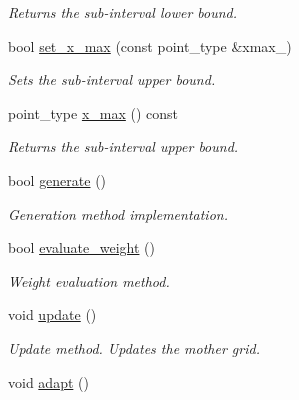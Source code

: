 \begin{DoxyCompactItemize}
\begin{DoxyCompactList}\small\item\em Returns the sub-\/interval lower bound. \end{DoxyCompactList}\item 
\hypertarget{a00391_aad23649c729902fce639ef5682b5e3a3}{bool \hyperlink{a00391_aad23649c729902fce639ef5682b5e3a3}{set\-\_\-x\-\_\-max} (const point\-\_\-type \&xmax\-\_\-)}\label{a00391_aad23649c729902fce639ef5682b5e3a3}

\begin{DoxyCompactList}\small\item\em Sets the sub-\/interval upper bound. \end{DoxyCompactList}\item 
\hypertarget{a00391_a2a42754998fd7d85c4b8bfbef8036386}{point\-\_\-type \hyperlink{a00391_a2a42754998fd7d85c4b8bfbef8036386}{x\-\_\-max} () const }\label{a00391_a2a42754998fd7d85c4b8bfbef8036386}

\begin{DoxyCompactList}\small\item\em Returns the sub-\/interval upper bound. \end{DoxyCompactList}\item 
\hypertarget{a00391_a91bda63aa8c27c87f3b3ad37249fe57d}{bool \hyperlink{a00391_a91bda63aa8c27c87f3b3ad37249fe57d}{generate} ()}\label{a00391_a91bda63aa8c27c87f3b3ad37249fe57d}

\begin{DoxyCompactList}\small\item\em Generation method implementation. \end{DoxyCompactList}\item 
\hypertarget{a00391_afad1106c20ce43cd97bd7b7ca6b6a313}{bool \hyperlink{a00391_afad1106c20ce43cd97bd7b7ca6b6a313}{evaluate\-\_\-weight} ()}\label{a00391_afad1106c20ce43cd97bd7b7ca6b6a313}

\begin{DoxyCompactList}\small\item\em Weight evaluation method. \end{DoxyCompactList}\item 
\hypertarget{a00391_a03f7fd27f856ee374dcb11e27241349e}{void \hyperlink{a00391_a03f7fd27f856ee374dcb11e27241349e}{update} ()}\label{a00391_a03f7fd27f856ee374dcb11e27241349e}

\begin{DoxyCompactList}\small\item\em Update method. Updates the mother grid. \end{DoxyCompactList}\item 
\hypertarget{a00391_ae28f5eaed0f1f090f1ac55506be4f469}{void \hyperlink{a00391_ae28f5eaed0f1f090f1ac55506be4f469}{adapt} ()}\label{a00391_ae28f5eaed0f1f090f1ac55506be4f469}


\end{DoxyCompactItemize}
